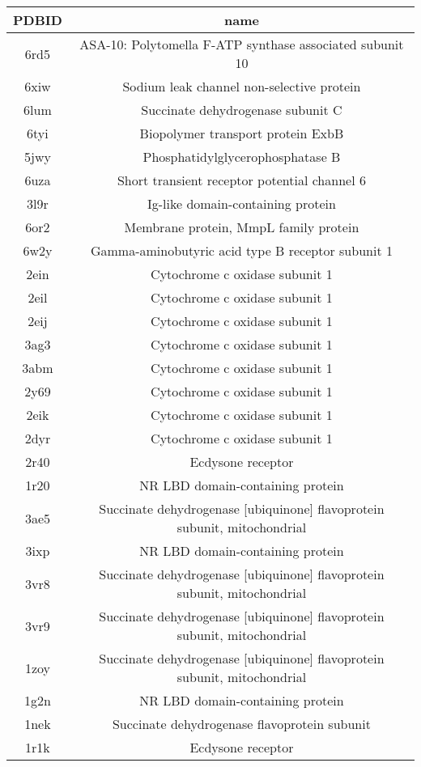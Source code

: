 \documentclass{article}
\begin{document}
\begin{table}[]
    \centering
    \begin{tabular}{c|c}
PDBID & name \\
\hline
6rd5 & ASA-10: Polytomella F-ATP synthase associated subunit 10 \\ 
6xiw & Sodium leak channel non-selective protein \\ 
6lum & Succinate dehydrogenase subunit C \\ 
6tyi & Biopolymer transport protein ExbB \\ 
5jwy & Phosphatidylglycerophosphatase B \\ 
6uza & Short transient receptor potential channel 6 \\ 
3l9r & Ig-like domain-containing protein \\ 
6or2 & Membrane protein, MmpL family protein \\ 
6w2y & Gamma-aminobutyric acid type B receptor subunit 1 \\ 
2ein & Cytochrome c oxidase subunit 1 \\ 
2eil & Cytochrome c oxidase subunit 1 \\ 
2eij & Cytochrome c oxidase subunit 1 \\ 
3ag3 & Cytochrome c oxidase subunit 1 \\ 
3abm & Cytochrome c oxidase subunit 1 \\ 
2y69 & Cytochrome c oxidase subunit 1 \\ 
2eik & Cytochrome c oxidase subunit 1 \\ 
2dyr & Cytochrome c oxidase subunit 1 \\ 
2r40 & Ecdysone receptor \\ 
1r20 & NR LBD domain-containing protein \\ 
3ae5 & Succinate dehydrogenase [ubiquinone] flavoprotein subunit, mitochondrial \\ 
3ixp & NR LBD domain-containing protein \\ 
3vr8 & Succinate dehydrogenase [ubiquinone] flavoprotein subunit, mitochondrial \\ 
3vr9 & Succinate dehydrogenase [ubiquinone] flavoprotein subunit, mitochondrial \\ 
1zoy & Succinate dehydrogenase [ubiquinone] flavoprotein subunit, mitochondrial \\ 
1g2n & NR LBD domain-containing protein \\ 
1nek & Succinate dehydrogenase flavoprotein subunit \\ 
1r1k & Ecdysone receptor \\ 

\end{tabular}
\end{table}
\end{document}
